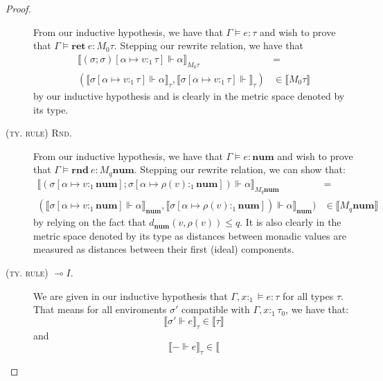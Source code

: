 \begin{proof}
\begin{description}
    From our inductive hypothesis, we have that $\Gamma \vDash e : \tau$ and
    wish to prove that $\Gamma \vDash \mathbf{ret} \ e : M_0 \tau$. Stepping our
    rewrite relation, we have that 
    \begin{equation}
      \begin{aligned}
        \llbracket (\sigma; \sigma)[\alpha \mapsto v:_1 \tau] \Vdash \alpha
        \rrbracket_{M_0 \tau} 
        &= \\
        (\llbracket \sigma[\alpha \mapsto v:_1 \tau] \Vdash \alpha
        \rrbracket_{\tau}, \llbracket \sigma[\alpha
        \mapsto v:_1 \tau] \Vdash \rrbracket_{\tau})
        &\in 
        \llbracket M_0 \tau \rrbracket
      \end{aligned}
    \end{equation}
    by our inductive hypothesis and is clearly  in the metric
    space denoted by its type.
  \item[\textsc{(ty. rule) Rnd.}]
    From our inductive hypothesis, we have that $\Gamma \vDash e : \mathbf{num}$ and
    wish to prove that $\Gamma \vDash \mathbf{rnd} \ e : M_q \mathbf{num}$. Stepping our
    rewrite relation, we can show that:
    \begin{equation}
      \begin{aligned}
        \llbracket (\sigma[\alpha \mapsto v:_1 \mathbf{num}]; \sigma[\alpha \mapsto
        \rho(v) :_1 \mathbf{num}]) \Vdash \alpha \rrbracket_{M_q \mathbf{num}} 
        &= \\
        (\llbracket \sigma[\alpha \mapsto v:_1 \mathbf{num}] \Vdash \alpha
        \rrbracket_{\mathbf{num}}, \llbracket \sigma[\alpha \mapsto \rho(v) :_1
        \mathbf{num}]) \Vdash \alpha \rrbracket_{\mathbf{num}})
        &\in \llbracket M_q \mathbf{num} \rrbracket
      \end{aligned}
    \end{equation}
    by relying on the fact that $d_{\mathbf{num}}(v, \rho(v)) \leq q$. It is
    also clearly  in the metric space denoted by its type as
    distances between monadic values are measured as distances between their
    first (ideal) components.
  \item[\textsc{(ty. rule) $\multimap I$.}] We are given in our inductive
    hypothesis that $\Gamma, x :_1 \vDash e : \tau$ for all types $\tau$. That
    means for all enviroments $\sigma'$ compatible with $\Gamma, x :_1 \tau_0$,
    we have that: 
    $$\llbracket \sigma' \Vdash e \rrbracket_{\tau} \in \llbracket \tau
    \rrbracket$$ and $$\llbracket - \Vdash e \rrbracket_{\tau} \in \llbracket
$$
\end{description}
\end{proof}
